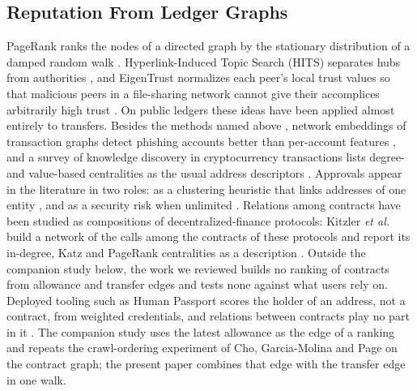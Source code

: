 \documentclass{ieeeaccess}
\begin{document}
\subsection{Reputation From Ledger Graphs}
PageRank ranks the nodes of a directed graph by the stationary distribution of a damped random walk \cite{page1999pagerank,langville2006pagerank}. Hyperlink-Induced Topic Search (HITS) separates hubs from authorities \cite{kleinberg1999hits}, and EigenTrust normalizes each peer's local trust values so that malicious peers in a file-sharing network cannot give their accomplices arbitrarily high trust \cite{kamvar2003eigentrust}. On public ledgers these ideas have been applied almost entirely to transfers. Besides the methods named above \cite{do2023hodgerank,do2023awp}, network embeddings of transaction graphs detect phishing accounts better than per-account features \cite{wu2022phishers}, and a survey of knowledge discovery in cryptocurrency transactions lists degree- and value-based centralities as the usual address descriptors \cite{liu2021knowledge}. Approvals appear in the literature in two roles: as a clustering heuristic that links addresses of one entity \cite{victor2020clustering}, and as a security risk when unlimited \cite{wang2022unlimited}. Relations among contracts have been studied as compositions of decentralized-finance protocols: Kitzler \emph{et al.} build a network of the calls among the contracts of these protocols and report its in-degree, Katz and PageRank centralities as a description \cite{kitzler2023defi}. Outside the companion study below, the work we reviewed builds no ranking of contracts from allowance and transfer edges and tests none against what users rely on. Deployed tooling such as Human Passport scores the holder of an address, not a contract, from weighted credentials, and relations between contracts play no part in it \cite{humanpassportnddocs}. The companion study \cite{kwon2026companion} uses the latest allowance as the edge of a ranking and repeats the crawl-ordering experiment of Cho, Garcia-Molina and Page \cite{cho1998crawling} on the contract graph; the present paper combines that edge with the transfer edge in one walk.
\end{document}
